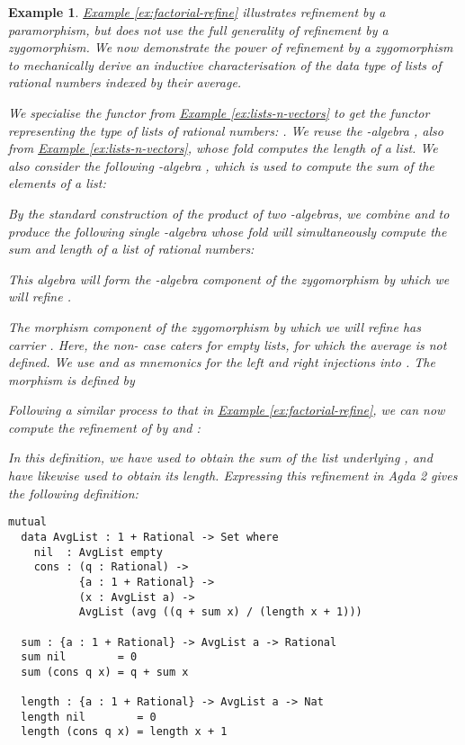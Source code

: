 \documentclass{LMCS}
\newtheorem{eorollary}{Example}
\newcommand{\exref}[1]{\hyperref[#1]{Example \ref*{#1}}}
\begin{document}
\begin{eorollary}
  \exref{ex:factorial-refine} illustrates refinement by a
  paramorphism, but does not use the full generality of refinement by
  a zygomorphism. We now demonstrate the power of refinement by a
  zygomorphism to mechanically derive an inductive characterisation of
  the data type of lists of rational numbers indexed by their average.

  We specialise the functor  from
  \exref{ex:lists-n-vectors} to get the functor representing the type
  of lists of rational numbers: . We reuse the -algebra
  , also from \exref{ex:lists-n-vectors}, whose fold
  computes the length of a list. We also consider the following
  -algebra , which is
  used to compute the sum of the elements of a list:
  
  By the standard construction of the product of two -algebras, we
  combine  and  to produce the
  following single -algebra whose fold
  will simultaneously compute the sum and length of a list of rational
  numbers: 
  
  This algebra will form the -algebra component of the zygomorphism
  by which we will refine .

  The morphism component of the zygomorphism by which we will refine
   has carrier . Here, the non- case caters for empty lists,
  for which the average is not defined. We use  and
   as mnemonics for the left and right injections into
  . The morphism  is defined by
 

  Following a similar process to that in
  \exref{ex:factorial-refine}, we can now compute the refinement of
   by  and
  :
  
  In this definition, we have used  to obtain the sum
  of the list underlying , and have likewise used 
  to obtain its length. Expressing this refinement in Agda 2 gives the
  following definition:
\begin{verbatim}
mutual
  data AvgList : 1 + Rational -> Set where
    nil  : AvgList empty
    cons : (q : Rational) ->
           {a : 1 + Rational} ->
           (x : AvgList a) ->
           AvgList (avg ((q + sum x) / (length x + 1)))

  sum : {a : 1 + Rational} -> AvgList a -> Rational
  sum nil        = 0
  sum (cons q x) = q + sum x

  length : {a : 1 + Rational} -> AvgList a -> Nat
  length nil        = 0
  length (cons q x) = length x + 1
\end{verbatim}

\end{eorollary}
\end{document}
